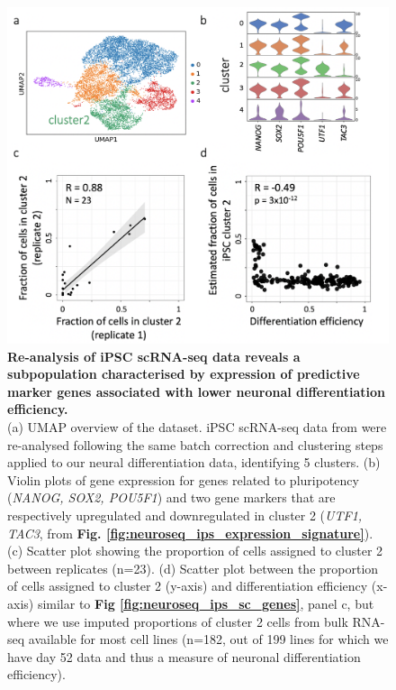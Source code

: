 \begin{figure}[h]
    \centering
    \includegraphics[width=15cm]{Appendix2/Fig/suppl_ips_cluster2.png}
    \caption[An iPSC sub-population is associated with lower differentiation efficiency]{\textbf{Re-analysis of iPSC scRNA-seq data reveals a subpopulation characterised by expression of predictive marker genes associated with lower neuronal differentiation efficiency.}\\
     (a) UMAP overview of the dataset. 
     iPSC scRNA-seq data from \cite{cuomo2020single} were re-analysed following the same batch correction and clustering steps applied to our neural differentiation data, identifying 5 clusters. 
     (b) Violin plots of gene expression for genes related to pluripotency (\textit{NANOG, SOX2, POU5F1}) and two gene markers that are respectively upregulated and downregulated in cluster 2 (\textit{UTF1, TAC3}, from \textbf{Fig. \ref{fig:neuroseq_ips_expression_signature}}). 
     (c) Scatter plot showing the proportion of cells assigned to cluster 2 between replicates (n=23). 
     (d) Scatter plot between the proportion of cells assigned to cluster 2 (y-axis) and differentiation efficiency (x-axis) similar to \textbf{Fig \ref{fig:neuroseq_ips_sc_genes}}, panel c, but where we use imputed proportions of cluster 2 cells from bulk RNA-seq available for most cell lines (n=182, out of 199 lines for which we have day 52 data and thus a measure of neuronal differentiation efficiency).}
    \label{suppl_fig:ipsc_cluster2}
\end{figure}


